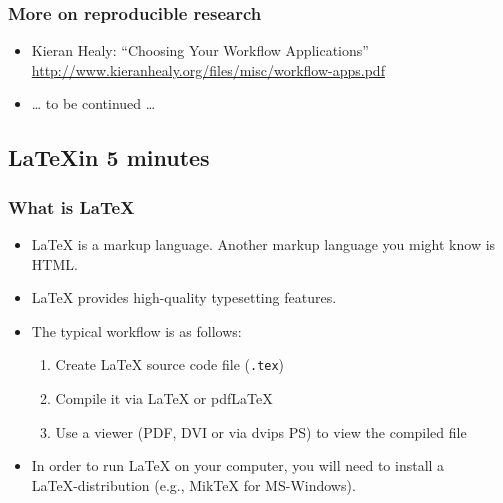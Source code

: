 \documentclass[bigger]{beamer}
\begin{document}
\begin{frame}
\frametitle{More on reproducible research}
\label{sec-9-1-5}

\begin{itemize}
\item Kieran Healy: \enquote{Choosing Your Workflow Applications}  \href{http://www.kieranhealy.org/files/misc/workflow-apps.pdf}{http://www.kieranhealy.org/files/misc/workflow-apps.pdf}
\item \ldots{} to be continued \ldots{}
\end{itemize}
\end{frame}
\subsection{\LaTeX in 5 minutes}
\label{sec-9-2}
\begin{frame}
\frametitle{What is \LaTeX}
\label{sec-9-2-1}
\begin{itemize}

\item \LaTeX{} is a markup language. Another markup language you might know is HTML.
\label{sec-9-2-1-1}%

\item \LaTeX{} provides high-quality typesetting features.
\label{sec-9-2-1-2}%

\item The typical workflow is as follows:
\label{sec-9-2-1-3}%
\begin{enumerate}
\item Create \LaTeX{} source code file (\texttt{.tex})
\item Compile it via \LaTeX{} or pdf\LaTeX
\item Use a viewer (PDF, DVI or via dvips PS) to view the compiled file
\end{enumerate}

\item In order to run \LaTeX{} on your computer, you will need to install a\\
\label{sec-9-2-1-4}%
\LaTeX-distribution (e.g., Mik\TeX{} for MS-Windows).  


\end{itemize} %
\end{frame}
\end{document}

